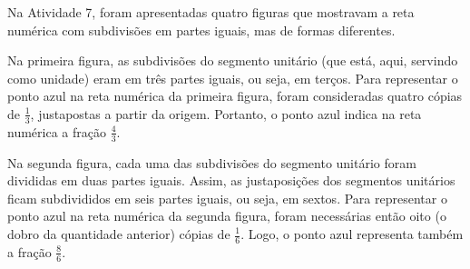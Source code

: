 \documentclass[a4,12pt]{book}
\begin{document}
\begin{refletindo*}
Na Atividade 7, foram apresentadas quatro figuras que mostravam a reta numérica com subdivisões em partes iguais, mas de formas diferentes.

Na primeira figura, as subdivisões do segmento unitário (que está, aqui, servindo como unidade) eram em três partes iguais, ou seja, em terços. Para representar o ponto azul na reta numérica da primeira figura, foram consideradas quatro cópias de $\frac{1}{3}$, justapostas a partir da origem. Portanto, o ponto azul indica na reta numérica a fração $\frac{4}{3}$.
\begin{center}
\end{center}

Na segunda figura, cada uma das subdivisões do segmento unitário foram divididas em duas partes iguais. Assim, as justaposições dos segmentos unitários ficam subdivididos em seis partes iguais, ou seja, em sextos. Para representar o ponto azul na reta numérica da segunda figura, foram necessárias então oito (o dobro da quantidade anterior) cópias de  $\frac{1}{6}$. Logo, o ponto azul representa também a fração $\frac{8}{6}$.

\begin{center}
\end{center}
\end{refletindo*}
\end{document}
